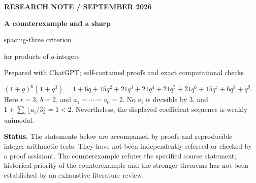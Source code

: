 \documentclass[11pt]{article}
\theoremstyle{research}
\theoremstyle{definition}
\newcommand{\qi}[1]{[#1]_q}
\newcommand{\qir}[2]{[#1]_{q^{#2}}}
\numberwithin{equation}{section}
\begin{document}
\thispagestyle{plain}
\begin{center}
  {\sffamily\small\bfseries\color{Teal}RESEARCH NOTE \quad /  SEPTEMBER 2026}\par
  \vspace{7pt}
  {\sffamily\bfseries\color{Ink}\LARGE A counterexample and a sharp\par
  spacing-three criterion\par
  for products of \boldmath$q$\unboldmath-integers}\par
  \vspace{8pt}
  {\small Prepared with ChatGPT; self-contained proofs and exact computational checks}
\end{center}

\begin{abstract}
We attack Conjecture 5.4 of Connelly, Ito, Martinez, Shevchenko, and Yang,
\emph{Unimodality of $q$-Fibonomial coefficients for small cases},
arXiv:2605.12822v1. Its necessity assertion is false:
$(1+q)^6(1+q^3)$ is unimodal but violates the proposed condition.
We then prove the conjectured sufficient condition for every spacing $r\ge2$.
For spacing three we obtain a complete replacement: if no $a_i$ is divisible
by three, then
\[
 \left(\prod_i\qi{a_i}\right)\qir{b}{3}\text{ is unimodal}
 \quad\Longleftrightarrow\quad
 b\le 1+\sum_i\left\lfloor\frac{a_i}{3}\right\rfloor
       +2\left\lfloor\frac{\#\{i:a_i\equiv2\pmod3\}}{6}\right\rfloor.
\]
A failed inequality produces a specified first-half coefficient drop of
exactly one. We also establish a general necessary degree bound, settle the
spacing-two criterion, and prove the sharp two-shift threshold
$(1+q)^n(1+q^r)$ unimodal if and only if $n\ge r^2-3$.
The arguments are finite and algebraic; computations are supplementary.
The main $q$-Fibonomial unimodality conjecture is not resolved here.
\end{abstract}

\begin{tcolorbox}[resultbox,title=The counterexample at a glance]
\[
 (1+q)^6(1+q^3)
 =1+6q+15q^2+21q^3+21q^4+21q^5+21q^6+15q^7+6q^8+q^9.
\]
Here $r=3$, $b=2$, and $a_1=\cdots=a_6=2$.
No $a_i$ is divisible by $3$, and
$1+\sum_i\lfloor a_i/3\rfloor=1<2$.
Nevertheless, the displayed coefficient sequence is weakly unimodal.
\end{tcolorbox}

\noindent\textbf{Status.} The statements below are accompanied by proofs and
reproducible integer-arithmetic tests. They have not been independently
refereed or checked by a proof assistant. The counterexample refutes the
specified source statement; historical priority of the counterexample and
the stronger theorems has not been established by an exhaustive literature review.
\end{document}
